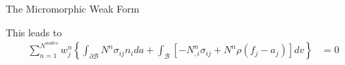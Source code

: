 \documentclass[11pt]{beamer}
\newcommand{\VEC}[1]{\utilde{#1}}
\begin{document}
\begin{frame}{The Micromorphic Weak Form}

This leads to
\begin{align*}
\sum_{n=1}^{N^{nodes}} w_j^n\left\{ \int_{\partial \mathcal{B}} N^n \sigma_{ij} n_i da + \int_{\mathcal{B}} \left[ - N_{,i}^{n} \sigma_{ij} + N^n \rho \left(f_j - a_j \right) \right] dv\right\} &= 0\\
\end{align*}



\end{frame}
\end{document}
